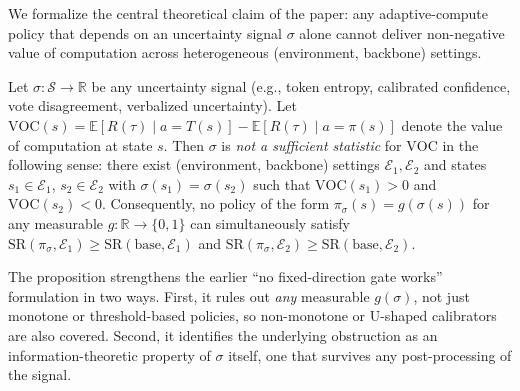 We formalize the central theoretical claim of the paper: any
adaptive-compute policy that depends on an uncertainty signal
$\sigma$ alone cannot deliver non-negative value of computation
across heterogeneous (environment, backbone) settings.

\begin{proposition}
\label{prop:necessity}
Let $\sigma : \mathcal{S} \to \mathbb{R}$ be any uncertainty
signal (e.g., token entropy, calibrated confidence, vote
disagreement, verbalized uncertainty). Let
$\mathrm{VOC}(s) =
 \mathbb{E}[R(\tau)\mid a{=}T(s)] -
 \mathbb{E}[R(\tau)\mid a{=}\pi(s)]$
denote the value of computation at state $s$.
Then $\sigma$ is \emph{not a sufficient statistic} for
$\mathrm{VOC}$ in the following sense: there exist (environment,
backbone) settings $\mathcal{E}_1, \mathcal{E}_2$ and states
$s_1 \in \mathcal{E}_1$, $s_2 \in \mathcal{E}_2$ with
$\sigma(s_1) = \sigma(s_2)$ such that
$\mathrm{VOC}(s_1) > 0$ and $\mathrm{VOC}(s_2) < 0$.
Consequently, no policy of the form
$\pi_\sigma(s) = g(\sigma(s))$ for any measurable
$g : \mathbb{R} \to \{0, 1\}$ can simultaneously satisfy
$\mathrm{SR}(\pi_\sigma, \mathcal{E}_1) \geq
 \mathrm{SR}(\mathrm{base}, \mathcal{E}_1)$ and
$\mathrm{SR}(\pi_\sigma, \mathcal{E}_2) \geq
 \mathrm{SR}(\mathrm{base}, \mathcal{E}_2)$.
\end{proposition}

The proposition strengthens the earlier ``no fixed-direction
gate works'' formulation in two ways. First, it rules out
\emph{any} measurable $g(\sigma)$, not just monotone or
threshold-based policies, so non-monotone or U-shaped
calibrators are also covered. Second, it identifies the
underlying obstruction as an information-theoretic property of
$\sigma$ itself, one that survives any post-processing of the
signal.

